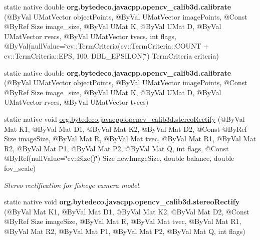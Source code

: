 \begin{DoxyCompactItemize}
\item 
\mbox{\label{group__calib3d__fisheye_gad137baca230e9c1a21b8bb6dd47e0760}} 
static native double {\bfseries org.\+bytedeco.\+javacpp.\+opencv\+\_\+calib3d.\+calibrate} (@By\+Val U\+Mat\+Vector object\+Points, @By\+Val U\+Mat\+Vector image\+Points, @Const @By\+Ref Size image\+\_\+size, @By\+Val U\+Mat K, @By\+Val U\+Mat D, @By\+Val U\+Mat\+Vector rvecs, @By\+Val U\+Mat\+Vector tvecs, int flags, @By\+Val(null\+Value=\char`\"{}cv\+::\+Term\+Criteria(cv\+::\+Term\+Criteria\+::\+C\+O\+U\+NT + cv\+::\+Term\+Criteria\+::\+E\+PS, 100, D\+B\+L\+\_\+\+E\+P\+S\+I\+L\+ON)\char`\"{}) Term\+Criteria criteria)
\item 
\mbox{\label{group__calib3d__fisheye_ga6910e5cf0da987e5a107f27ac2570df1}} 
static native double {\bfseries org.\+bytedeco.\+javacpp.\+opencv\+\_\+calib3d.\+calibrate} (@By\+Val U\+Mat\+Vector object\+Points, @By\+Val U\+Mat\+Vector image\+Points, @Const @By\+Ref Size image\+\_\+size, @By\+Val U\+Mat K, @By\+Val U\+Mat D, @By\+Val U\+Mat\+Vector rvecs, @By\+Val U\+Mat\+Vector tvecs)
\item 
static native void \hyperlink{group__calib3d__fisheye_ga8733df626f7839fe698cc024f4836938}{org.\+bytedeco.\+javacpp.\+opencv\+\_\+calib3d.\+stereo\+Rectify} (@By\+Val Mat K1, @By\+Val Mat D1, @By\+Val Mat K2, @By\+Val Mat D2, @Const @By\+Ref Size image\+Size, @By\+Val Mat R, @By\+Val Mat tvec, @By\+Val Mat R1, @By\+Val Mat R2, @By\+Val Mat P1, @By\+Val Mat P2, @By\+Val Mat Q, int flags, @Const @By\+Ref(null\+Value=\char`\"{}cv\+::\+Size()\char`\"{}) Size new\+Image\+Size, double balance, double fov\+\_\+scale)
\begin{DoxyCompactList}\small\item\em Stereo rectification for fisheye camera model. \end{DoxyCompactList}\item 
\mbox{\label{group__calib3d__fisheye_ga8c949ece6153333cfd48ef4255adc366}} 
static native void {\bfseries org.\+bytedeco.\+javacpp.\+opencv\+\_\+calib3d.\+stereo\+Rectify} (@By\+Val Mat K1, @By\+Val Mat D1, @By\+Val Mat K2, @By\+Val Mat D2, @Const @By\+Ref Size image\+Size, @By\+Val Mat R, @By\+Val Mat tvec, @By\+Val Mat R1, @By\+Val Mat R2, @By\+Val Mat P1, @By\+Val Mat P2, @By\+Val Mat Q, int flags)
\item 
\mbox{\label{group__calib3d__fisheye_gaef473d4ee9ac46923131367d5ca08ceb}} 

\end{DoxyCompactItemize}

